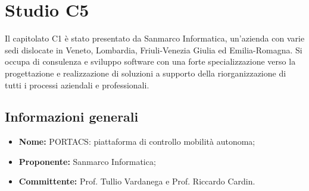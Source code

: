 \section{Studio C5}
Il capitolato C1 è stato presentato da Sanmarco Informatica, un’azienda con varie sedi dislocate in Veneto, Lombardia, Friuli-Venezia Giulia ed Emilia-Romagna. Si occupa di consulenza e sviluppo software con una forte specializzazione verso la progettazione e realizzazione di soluzioni a supporto della riorganizzazione di tutti i processi aziendali e professionali.
\subsection{Informazioni generali}
\begin{itemize}
    \item \textbf{Nome:} PORTACS: piattaforma di controllo mobilità autonoma;
    \item \textbf{Proponente:} Sanmarco Informatica;
    \item \textbf{Committente:} Prof. Tullio Vardanega e Prof. Riccardo Cardin.
\end{itemize}

